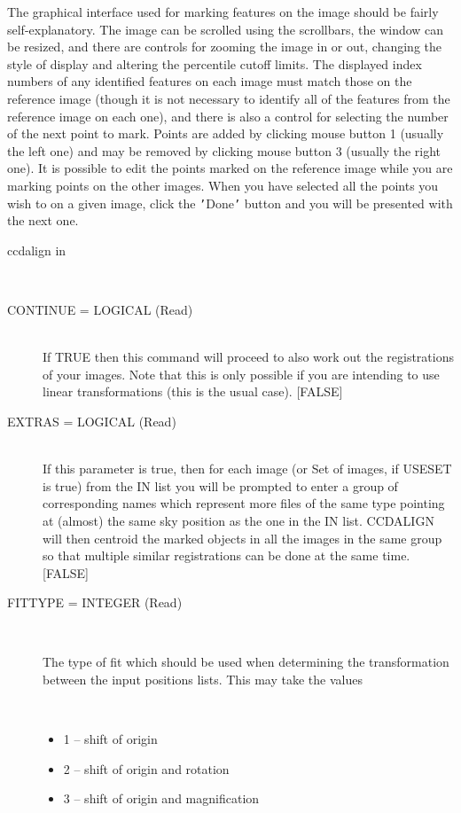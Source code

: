 \documentclass[twoside,11pt]{article}
\renewcommand{\_}{\texttt{\symbol{95}}}
\newcommand{\routine}[1]{{\sc #1}}
\newcommand{\sstusage}[1]{\item[Usage:] \mbox{}
   \begin{description}
      {\ssttt \item #1}
   \end{description}
}
\newcommand{\sstparameters}[1]{
   \item[Parameters:] \mbox{} \\
   \vspace{-3.5ex}
   \begin{description}
      #1
   \end{description}
}
\newcommand{\sstsubsection}[1]{ \item[{#1}] \mbox{} \\}
\newcommand{\sstitemlist}[1]{
  \mbox{} \\
  \vspace{-3.5ex}
  \begin{itemize}
     #1
  \end{itemize}
}
\newcommand{\sstitem}{\item}
\newcommand{\sstusage}[1]{\item[Usage:]
      \begin{description}
         {\ssttt #1}
      \end{description}
      \\
   }
\newcommand{\sstparameters}[1]{
      \item[Parameters:] \\
      \begin{description}
         #1
      \end{description}
      \\
   }
\newcommand{\sstsubsection}[1]{\item[{#1}]}
\newcommand{\sstitemlist}[1]{
      \begin{itemize}
         #1
      \end{itemize}
      \\
   }
\newcommand{\sstitem}{\item}
\begin{document}
{{      The graphical interface used for marking features on the image
      should be fairly self-explanatory.  The image can be scrolled using
      the scrollbars, the window can be resized, and there are controls
      for zooming the image in or out, changing the style of display and
      altering the percentile cutoff limits.  The displayed index numbers
      of any identified features on each image must match those on the
      reference image (though it is not necessary to identify all of
      the features from the reference image on each one), and there is
      also a control for selecting the number of the next point to mark.
      Points are added by clicking mouse button 1 (usually the left one)
      and may be removed by clicking mouse button 3 (usually the right
      one).  It is possible to edit the points marked on the reference
      image while you are marking points on the other images.  When
      you have selected all the points you wish to on a given image,
      click the {\tt '}Done{\tt '} button and you will be presented with the next
      one.
   }
   \sstusage{
      ccdalign in
   }
   \sstparameters{
      \sstsubsection{
         CONTINUE = \_LOGICAL (Read)
      }{
         If TRUE then this command will proceed to also work
         out the registrations of your images. Note that this is
         only possible if you are intending to use linear
         transformations (this is the usual case).
         [FALSE]
      }
      \sstsubsection{
         EXTRAS = \_LOGICAL (Read)
      }{
         If this parameter is true, then for each image (or Set of
         images, if USESET is true) from the IN list you will be
         prompted to enter a group of corresponding names which
         represent more files of the same type pointing at (almost)
         the same sky position as the one in the IN list.  \routine{CCDALIGN}
         will then centroid the marked objects in all the images
         in the same group so that multiple similar registrations
         can be done at the same time.
         [FALSE]
      }
      \sstsubsection{
         FITTYPE = \_INTEGER (Read)
      }{
         The type of fit which should be used when determining the
         transformation between the input positions lists. This may take
         the values
         \sstitemlist{

            \sstitem
               1 -- shift of origin

            \sstitem
               2 -- shift of origin and rotation

            \sstitem
               3 -- shift of origin and magnification

}}}}
\end{document}
